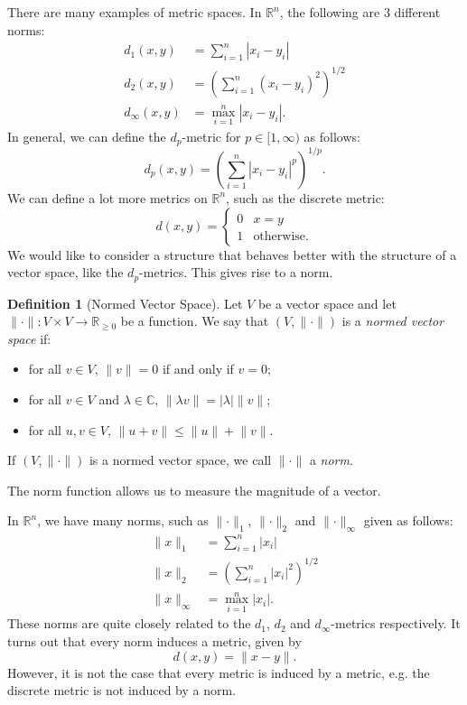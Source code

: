 \documentclass[a4paper, openany]{memoir}
\theoremstyle{definition}
\newtheorem{definition}{Definition}[section]
\theoremstyle{plain}
\begin{document}
    There are many examples of metric spaces. In $\mathbb{R}^n$, the following are 3 different norms:
    \begin{align*}
        d_1(x, y) &= \sum_{i=1}^n |x_i - y_i| \\
        d_2(x, y) &= \left(\sum_{i=1}^n (x_i - y_i)^2\right)^{1/2} \\
        d_\infty(x, y) &= \max_{i=1}^n |x_i - y_i|.
    \end{align*}
    In general, we can define the $d_p$-metric for $p \in [1, \infty)$ as follows:
    \[d_p(x, y) = \left(\sum_{i=1}^n |x_i - y_i|^p \right)^{1/p}.\]
    We can define a lot more metrics on $\mathbb{R}^n$, such as the discrete metric:
    \[d(x, y) = \begin{cases}
        0 & x = y \\
        1 & \textrm{otherwise}.
    \end{cases}\]
    We would like to consider a structure that behaves better with the structure of a vector space, like the $d_p$-metrics. This gives rise to a norm.
    \begin{definition}[Normed Vector Space]
        Let $V$ be a vector space and let $\lVert \cdot \rVert \colon V \times V \to \mathbb{R}_{\geq 0}$ be a function. We say that $(V, \lVert \cdot \rVert)$ is a \emph{normed vector space} if:
        \begin{itemize}
            \item for all $v \in V$, $\lVert v \rVert = 0$ if and only if $v = 0$;
            \item for all $v \in V$ and $\lambda \in \mathbb{C}$, $\lVert \lambda v \rVert = |\lambda| \lVert v \rVert$;
            \item for all $u, v \in V$, $\lVert u + v \rVert \leq \lVert u \rVert + \lVert v \rVert$.
        \end{itemize}
        If $(V, \lVert \cdot \rVert)$ is a normed vector space, we call $\lVert \cdot \rVert$ a \emph{norm}.
    \end{definition}
    \noindent The norm function allows us to measure the magnitude of a vector.

    In $\mathbb{R}^n$, we have many norms, such as $\lVert \cdot \rVert_1$, $\lVert \cdot \rVert_2$ and $\lVert \cdot \rVert_\infty$ given as follows:
    \begin{align*}
        \lVert x \rVert_1 &= \sum_{i=1}^n |x_i| \\
        \lVert x \rVert_2 &= \left(\sum_{i=1}^n |x_i|^2 \right)^{1/2} \\
        \lVert x \rVert_\infty &= \max_{i=1}^n |x_i|.
    \end{align*}
    These norms are quite closely related to the $d_1$, $d_2$ and $d_\infty$-metrics respectively. It turns out that every norm induces a metric, given by
    \[d(x, y) = \lVert x - y \rVert.\]
    However, it is not the case that every metric is induced by a metric, e.g. the discrete metric is not induced by a norm.
\end{document}
